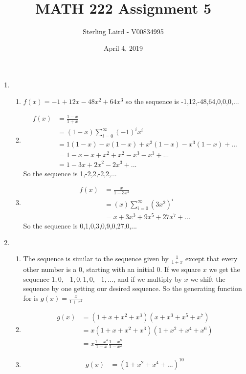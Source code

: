 \documentclass[11pt]{article}
\title{MATH 222 Assignment 5}
\author{Sterling Laird - V00834995}
\date{April 4, 2019}
\begin{document}
\maketitle
\pagebreak

\begin{enumerate}[]
\item
	\begin{enumerate}
	\item $f(x) = -1 + 12x -48x^2 + 64x^3$ so the sequence is -1,12,-48,64,0,0,0,...
	\item 
	\begin{align}
		f(x) &= \frac{1-x}{1+x} \nonumber\\
		&= (1-x)\sum_{i=0}^\infty(-1)^ix^i \nonumber\\
		&= 1(1-x) - x(1-x) + x^2(1-x) - x^3(1-x) +... \nonumber\\
		&= 1 - x - x + x^2 + x^2 - x^3 - x^3 +... \nonumber\\
		&= 1-3x+2x^2-2x^3+... \nonumber
	\end{align}
	So the sequence is 1,-2,2,-2,2,...
	\item
	\begin{align}
		f(x) &= \frac{x}{1-3x^2} \nonumber\\
		&= (x)\sum_{i=0}^\infty (3x^2)^i \nonumber\\
		&= x+3x^3+9x^5+27x^7+... \nonumber
	\end{align}
	So the sequence is 0,1,0,3,0,9,0,27,0,...
	\end{enumerate}
\item
	\begin{enumerate}
	\item
	The sequence is similar to the sequence given by $\frac{1}{1+x}$ except that every other number is a 0, starting with an initial 0. If we square $x$ we get the sequence $1,0,-1,0,1,0,-1,...$, and if we multiply by $x$ we shift the sequence by one getting our desired sequence. So the generating function for is $g(x)=\frac{x}{1+x^2}$
	\item 
	\begin{align}
		g(x) &= (1+x+x^2+x^3)(x+x^3+x^5+x^7) \nonumber\\
		&= x(1+x+x^2+x^3)(1+x^2+x^4+x^6) \nonumber\\
		&= x\frac{1-x^4}{1-x}\frac{1-x^8}{1-x^2}\nonumber
	\end{align}
	\item
	\begin{align}
		g(x) &= (1+x^2+x^4+...)^{10} \nonumber\\

\end{align}
\end{enumerate}
\end{enumerate}
\end{document}
